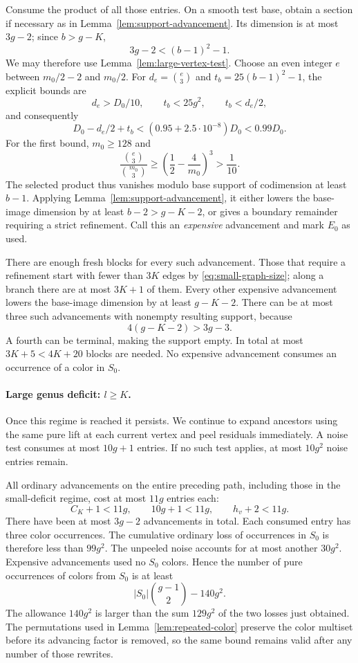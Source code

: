 Consume the product of all those entries.  On a smooth test base,
obtain a section if necessary as in
Lemma~\ref{lem:support-advancement}.  Its dimension is at most \(3g-2\);
since \(b>g-K\),
\[
 3g-2<(b-1)^2-1.
\]
We may therefore use Lemma~\ref{lem:large-vertex-test}.
Choose an even integer \(e\) between \(m_0/2-2\) and \(m_0/2\).
For \(d_e=\binom e3\) and \(t_b=25(b-1)^2-1\), the explicit bounds are
\[
 d_e>D_0/10,\qquad t_b<25g^2,\qquad t_b<d_e/2,
\]
and consequently
\begin{equation}
\label{eq:large-test-threshold}
 D_0-d_e/2+t_b
   <(0.95+2.5\cdot10^{-8})D_0<0.99D_0.
\end{equation}
For the first bound, \(m_0\ge128\) and
\[
 \frac{\binom e3}{\binom{m_0}3}
 \ge \left(\frac12-\frac4{m_0}\right)^3>\frac1{10}.
\]
The selected product thus vanishes modulo base support of codimension
at least \(b-1\).  Applying
Lemma~\ref{lem:support-advancement}, it either lowers the base-image
dimension by at least \(b-2>g-K-2\), or gives a boundary remainder
requiring a strict refinement.  Call this an \emph{expensive}
advancement and mark \(E_0\) as used.

There are enough fresh blocks for every such advancement.
Those that require a refinement start with fewer than \(3K\) edges by
\eqref{eq:small-graph-size}; along a branch there are at most \(3K+1\)
of them.  Every other expensive advancement lowers the base-image
dimension by at least \(g-K-2\).  There can be at most three such
advancements with nonempty resulting support, because
\[
 4(g-K-2)>3g-3.
\]
A fourth can be terminal, making the support empty.
In total at most \(3K+5<4K+20\) blocks are needed.
No expensive advancement consumes an occurrence of a color in \(S_0\).

\paragraph{Large genus deficit: \(l\ge K\).}
Once this regime is reached it persists.  We continue to expand
ancestors using the same pure lift at each current vertex and peel
residuals immediately.  A noise test consumes at most \(10g+1\) entries.
If no such test applies, at most \(10g^2\) noise entries remain.

All ordinary advancements on the entire preceding path, including
those in the small-deficit regime, cost at most \(11g\) entries each:
\[
 C_K+1<11g,\qquad 10g+1<11g,\qquad h_v+2<11g.
\]
There have been at most \(3g-2\) advancements in total.
Each consumed entry has three color occurrences.  The cumulative
ordinary loss of occurrences in \(S_0\) is therefore less than
\(99g^2\).  The unpeeled noise accounts for at most another \(30g^2\).
Expensive advancements used no \(S_0\) colors.  Hence the number of
pure occurrences of colors from \(S_0\) is at least
\begin{equation}
\label{eq:remaining-pure-occurrences}
 |S_0|\binom{g-1}{2}-140g^2.
\end{equation}
The allowance \(140g^2\) is larger than the sum \(129g^2\) of the
two losses just obtained.
The permutations used in Lemma~\ref{lem:repeated-color} preserve the
color multiset before its advancing factor is removed, so the same
bound remains valid after any number of those rewrites.

